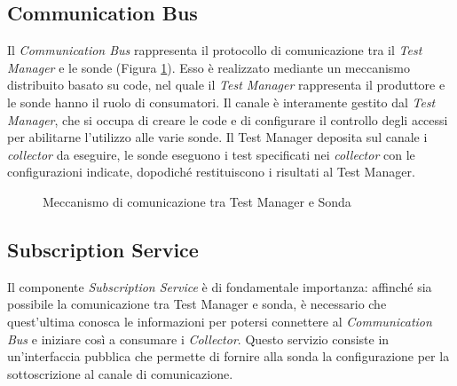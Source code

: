 \documentclass[../main.tex]{subfiles}
\begin{document}
\subsection{Communication Bus}
Il \textit{Communication Bus} rappresenta il protocollo di comunicazione tra il \textit{Test Manager} e le sonde (Figura \ref{fig:CommunicationSonda}).
Esso è realizzato mediante un meccanismo distribuito basato su code, nel quale il \textit{Test Manager} rappresenta il produttore e le sonde hanno il ruolo di consumatori.
Il canale è interamente gestito dal \textit{Test Manager}, che si occupa di creare le code e di configurare il controllo degli accessi per abilitarne l'utilizzo alle varie sonde.
Il Test Manager deposita sul canale i \textit{collector}\cite{CumulusBigDoc} da eseguire, le sonde eseguono i test specificati nei \textit{collector} con le configurazioni indicate, dopodiché restituiscono i risultati al Test Manager.
\begin{figure}[H]
\centering
{}
\caption{Meccanismo di comunicazione tra Test Manager e Sonda}\label{fig:CommunicationSonda}
\end{figure}
\newpage
\subsection {Subscription Service}
Il componente \textit{Subscription Service} è di fondamentale importanza: affinché sia possibile la comunicazione tra Test Manager e sonda, è necessario che quest'ultima conosca le informazioni per potersi connettere al \textit{Communication Bus} e iniziare così a consumare i \textit{Collector}.
Questo servizio consiste in un'interfaccia pubblica che permette di fornire alla sonda la configurazione per la sottoscrizione al canale di comunicazione.
\end{document}
